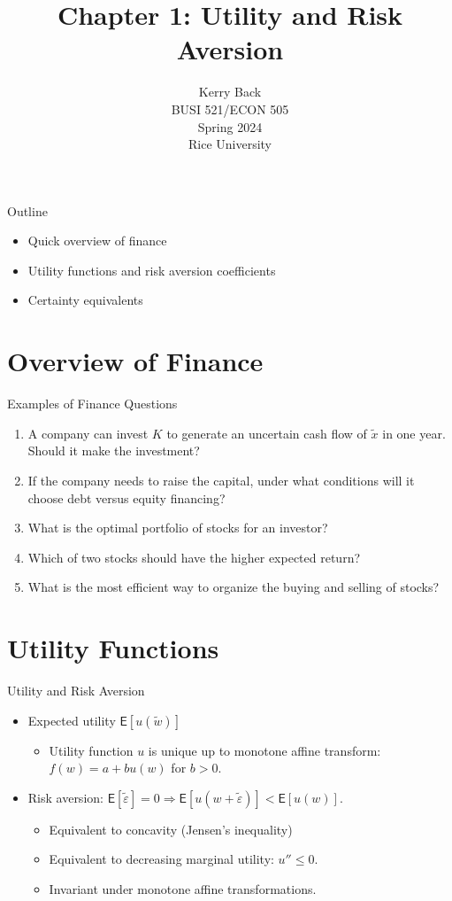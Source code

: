 \documentclass[10pt]{beamer}
\title{Chapter 1: Utility and Risk Aversion}
\date{}
\author{Kerry Back\\ 
BUSI 521/ECON 505\\
Spring 2024\\
Rice University}
\newcommand{\bi}{\begin{itemize}}
\newcommand{\ei}{\end{itemize}}
\newcommand{\im}{\item}
\newcommand{\mye}{\ensuremath{\mathsf{E}}}
\begin{document}
\maketitle

\begin{frame}{Outline}
  \bi 
  \im Quick overview of finance
  \im Utility functions and risk aversion coefficients
  \im Certainty equivalents
  \ei
\end{frame}

\section{Overview of Finance}


\begin{frame}{Examples of Finance Questions}

\begin{enumerate}
\item A company can invest $K$ to generate an uncertain cash flow of $\tilde{x}$ in one year.  Should it make the investment?
\item If the company needs to raise the capital, under what conditions will it choose debt versus equity financing?
\item What is the optimal portfolio of stocks for an investor?
\item Which of two stocks should have the higher expected return?
\item What is the most efficient way to organize the buying and selling of stocks?
\end{enumerate}
\end{frame}

\section{Utility Functions}

\begin{frame}{Utility and Risk Aversion}
\bi

\im Expected utility $\mye[u(\tilde{w})]$
\bi
\im Utility function $u$ is unique up to monotone affine transform: $f(w) = a+b u(w)$ for $b>0$.
\ei

\im Risk aversion: $\mye[\tilde{\varepsilon}]=0 \Rightarrow \mye[u(w+\tilde{\varepsilon})] < \mye[u(w)]$.
\bi
\im Equivalent to concavity (Jensen's inequality)
\im Equivalent to decreasing marginal utility: $u'' \leq 0$.
\im Invariant under monotone affine transformations.
\ei

\ei
\end{frame}
\end{document}
